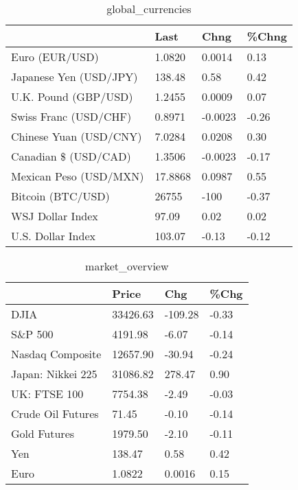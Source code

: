 \documentclass{article}%
\begin{document}
%


\begin{table}[htbp]%
\caption{global\_currencies}%
\centering%
\begin{adjustbox}{width=1\textwidth}%
\begin{tabular}{llll}
\toprule
                       &    Last &    Chng & \%Chng \\
\midrule
        Euro (EUR/USD) &  1.0820 &  0.0014 &  0.13 \\
Japanese Yen (USD/JPY) &  138.48 &    0.58 &  0.42 \\
  U.K. Pound (GBP/USD) &  1.2455 &  0.0009 &  0.07 \\
 Swiss Franc (USD/CHF) &  0.8971 & -0.0023 & -0.26 \\
Chinese Yuan (USD/CNY) &  7.0284 &  0.0208 &  0.30 \\
  Canadian \$ (USD/CAD) &  1.3506 & -0.0023 & -0.17 \\
Mexican Peso (USD/MXN) & 17.8868 &  0.0987 &  0.55 \\
     Bitcoin (BTC/USD) &   26755 &    -100 & -0.37 \\
      WSJ Dollar Index &   97.09 &    0.02 &  0.02 \\
     U.S. Dollar Index &  103.07 &   -0.13 & -0.12 \\
\bottomrule
\end{tabular}
%
\end{adjustbox}%
\end{table}

%


\begin{table}[htbp]%
\caption{market\_overview}%
\centering%
\begin{adjustbox}{width=1\textwidth}%
\begin{tabular}{llll}
\toprule
                  &    Price &     Chg &  \%Chg \\
\midrule
             DJIA & 33426.63 & -109.28 & -0.33 \\
          S\&P 500 &  4191.98 &   -6.07 & -0.14 \\
 Nasdaq Composite & 12657.90 &  -30.94 & -0.24 \\
Japan: Nikkei 225 & 31086.82 &  278.47 &  0.90 \\
     UK: FTSE 100 &  7754.38 &   -2.49 & -0.03 \\
Crude Oil Futures &    71.45 &   -0.10 & -0.14 \\
     Gold Futures &  1979.50 &   -2.10 & -0.11 \\
              Yen &   138.47 &    0.58 &  0.42 \\
             Euro &   1.0822 &  0.0016 &  0.15 \\
\bottomrule
\end{tabular}
%
\end{adjustbox}%
\end{table}

%
\end{document}

